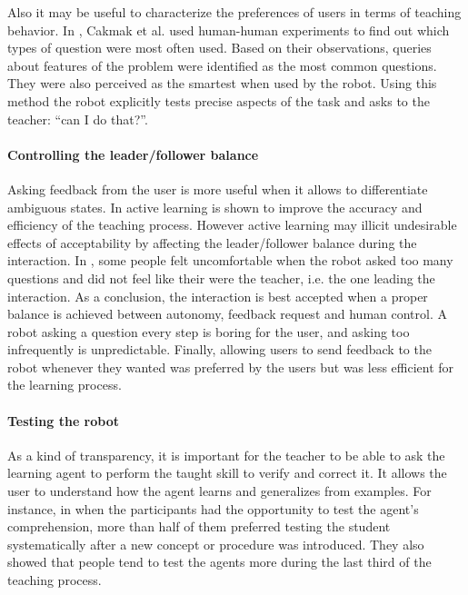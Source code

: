 Also it may be useful to characterize the preferences of users in terms of teaching behavior. In \cite{cakmak2012designing}, Cakmak et al. used human-human experiments to find out which types of question were most often used. Based on their observations, queries about features of the problem were identified as the most common questions. They were also perceived as the smartest when used by the robot. Using this method the robot explicitly tests precise aspects of the task and asks to the teacher: ``can I do that?''.

\paragraph{Controlling the leader/follower balance} Asking feedback from the user is more useful when it allows to differentiate ambiguous states. In \cite{chao2010transparent} active learning is shown to improve the accuracy and efficiency of the teaching process. However active learning may illicit undesirable effects of acceptability by affecting the leader/follower balance during the interaction. In \cite{chao2010transparent}, some people felt uncomfortable when the robot asked too many questions and did not feel like their were the teacher, i.e. the one leading the interaction. As a conclusion, the interaction is best accepted when a proper balance is achieved between autonomy, feedback request and human control. A robot asking a question every step is boring for the user, and asking too infrequently is unpredictable. Finally, allowing users to send feedback to the robot whenever they wanted was preferred by the users but was less efficient for the learning process.


\paragraph{Testing the robot} As a kind of transparency, it is important for the teacher to be able to ask the learning agent to perform the taught skill to verify and correct it. It allows the user to understand how the agent learns and generalizes from examples. For instance, in \cite{kaochar2011towards} when the participants had the opportunity to test the agent's comprehension, more than half of them preferred testing the student systematically after a new concept or procedure was introduced. They also showed that people tend to test the agents more during the last third of the teaching process.

